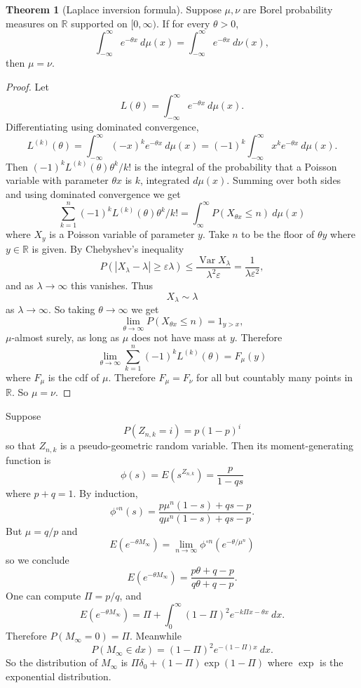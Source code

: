 \documentclass[12pt]{book}
\newcommand{\RR}{\mathbb{R}}
\DeclareMathOperator{\Var}{Var}
\theoremstyle{definition}
\newtheorem{theorem}{Theorem}[chapter]
\newenvironment{example}
  {\pushQED{\qed}\renewcommand{\qedsymbol}{$\diamondsuit$}\examplex}
  {\popQED\endexamplex}
\begin{document}
\begin{theorem}[Laplace inversion formula]
Suppose $\mu,\nu$ are Borel probability measures on $\RR$ supported on $[0, \infty)$.
If for every $\theta > 0$,
$$\int_{-\infty}^\infty e^{-\theta x} ~d\mu(x) = \int_{-\infty}^\infty e^{-\theta x} ~d\nu(x),$$
then $\mu = \nu$.
\end{theorem}
\begin{proof}
Let
$$L(\theta) = \int_{-\infty}^\infty e^{-\theta x}~d\mu(x).$$
Differentiating using dominated convergence,
$$L^{(k)}(\theta) = \int_{-\infty}^\infty (-x)^k e^{-\theta x} ~d\mu(x) = (-1)^k \int_{-\infty}^\infty x^k e^{-\theta x}~d\mu(x).$$
Then $(-1)^k L^{(k)}(\theta) \theta^k/k!$ is the integral of the probability that a Poisson variable with parameter $\theta x$ is $k$, integrated $d\mu(x)$.
Summing over both sides and using dominated convergence we get
$$\sum_{k=1}^n (-1)^k L^{(k)}(\theta) \theta^k/k! = \int_{\infty}^\infty P(X_{\theta x} \leq n) ~d\mu(x)$$
where $X_y$ is a Poisson variable of parameter $y$.
Take $n$ to be the floor of $\theta y$ where $y \in \RR$ is given.
By Chebyshev's inequality
$$P(|X_\lambda - \lambda| \geq \varepsilon \lambda) \leq \frac{\Var X_\lambda}{\lambda^2 \varepsilon} = \frac{1}{\lambda \varepsilon^2},$$
and as $\lambda \to \infty$ this vanishes. Thus
$$X_\lambda \sim \lambda$$
as $\lambda \to \infty$.
So taking $\theta \to \infty$ we get
$$\lim_{\theta \to \infty} P(X_{\theta x} \leq n) = 1_{y > x},$$
$\mu$-almost surely, as long as $\mu$ does not have mass at $y$.
Therefore
$$\lim_{\theta \to \infty} \sum_{k=1}^n (-1)^k L^{(k)}(\theta) = F_\mu(y)$$
where $F_\mu$ is the cdf of $\mu$.
Therefore $F_\mu = F_\nu$ for all but countably many points in $\RR$.
So $\mu = \nu$.
\end{proof}

\begin{example}
Suppose
$$P(Z_{n,k} = i) = p(1 - p)^i$$
so that $Z_{n,k}$ is a pseudo-geometric random variable.
Then its moment-generating function is
$$\phi(s) = E(s^{Z_{n,k}}) = \frac{p}{1 - qs}$$
where $p + q = 1$.
By induction,
$$\phi^{\circ n}(s) = \frac{p\mu^n(1 - s) + qs - p}{q\mu^n(1 - s) + qs - p}.$$
But $\mu = q/p$ and
$$E(e^{-\theta M_\infty}) = \lim_{n \to \infty} \phi^{\circ n}(e^{-\theta/\mu^n})$$
so we conclude
$$E(e^{-\theta M_\infty}) = \frac{p\theta + q - p}{q\theta + q - p}.$$
One can compute $\Pi = p/q$, and
$$E(e^{-\theta M_\infty}) = \Pi + \int_0^\infty (1 - \Pi)^2 e^{-k\Pi x - \theta x} ~dx.$$
Therefore $P(M_\infty = 0) = \Pi$.
Meanwhile
$$P(M_\infty \in dx) = (1 - \Pi)^2 e^{-(1 - \Pi)x} ~dx.$$
So the distribution of $M_\infty$ is $\Pi \delta_0 + (1 - \Pi)\exp(1 - \Pi)$ where $\exp$ is the exponential distribution.
\end{example}
\end{document}
